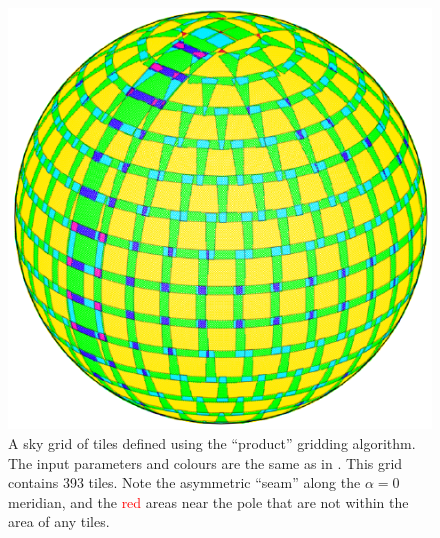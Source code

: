 \begin{colsection}
\begin{colsection}
\begin{figure}[p]
\begin{minipage}[c]{0.50\textwidth}
\caption[The ``cosine'' gridding algorithm]{A sky grid of tiles defined using the ``product'' gridding algorithm. The input parameters and colours are the same as in . This grid contains 393 tiles. Note the asymmetric ``seam'' along the $\alpha=0$ meridian, and the \textcolor{red}{red} areas near the pole that are not within the area of any tiles.}
\label{fig:cosine}
\end{minipage}
\hfill
\begin{minipage}[c]{0.46\textwidth}
\includegraphics[width=\linewidth]{images/algo_cosine.pdf}
\end{minipage}
\end{figure}


\end{colsection}
\end{colsection}
